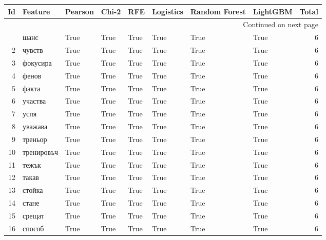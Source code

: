 \begin{longtable}{rlllllllr}
\toprule
  Id &     Feature &  Pearson &  Chi-2 &    RFE &  Logistics &  Random Forest &  LightGBM &  Total \\
\midrule
\endhead
\midrule
\multicolumn{9}{r}{{Continued on next page}} \\
\midrule
\endfoot

\bottomrule
\endlastfoot
   1 &        шанс &     True &   True &   True &       True &           True &      True &      6 \\
   2 &      чувств &     True &   True &   True &       True &           True &      True &      6 \\
   3 &    фокусира &     True &   True &   True &       True &           True &      True &      6 \\
   4 &       фенов &     True &   True &   True &       True &           True &      True &      6 \\
   5 &       факта &     True &   True &   True &       True &           True &      True &      6 \\
   6 &     участва &     True &   True &   True &       True &           True &      True &      6 \\
   7 &        успя &     True &   True &   True &       True &           True &      True &      6 \\
   8 &     уважава &     True &   True &   True &       True &           True &      True &      6 \\
   9 &     треньор &     True &   True &   True &       True &           True &      True &      6 \\
  10 &  тренировъч &     True &   True &   True &       True &           True &      True &      6 \\
  11 &       тежък &     True &   True &   True &       True &           True &      True &      6 \\
  12 &       такав &     True &   True &   True &       True &           True &      True &      6 \\
  13 &      стойка &     True &   True &   True &       True &           True &      True &      6 \\
  14 &       стане &     True &   True &   True &       True &           True &      True &      6 \\
  15 &      срещат &     True &   True &   True &       True &           True &      True &      6 \\
  16 &      способ &     True &   True &   True &       True &           True &      True &      6 \\

\end{longtable}
